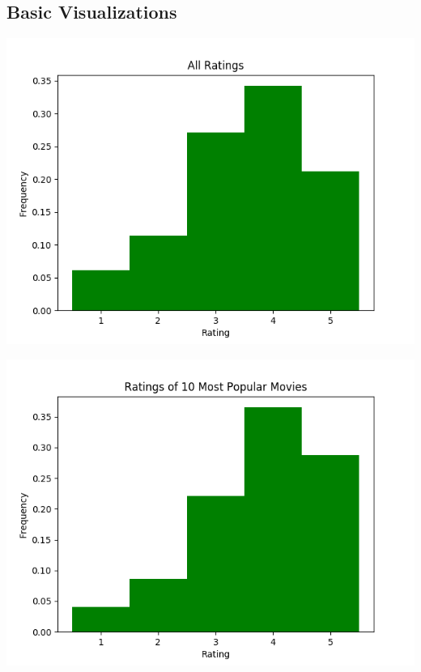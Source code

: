 \begin{appendices}
\pagebreak

\section{Basic Visualizations}

\begin{center}
  \begin{minipage}{0.49\linewidth}
    \includegraphics[scale=0.5]{"All Ratings"}
    \captionsetup{width=.75\linewidth}
  \end{minipage}
  \begin{minipage}{0.49\linewidth}
    \includegraphics[scale=0.5]{"Ratings of 10 Most Popular Movies"}

\end{minipage}
\end{center}
\end{appendices}
